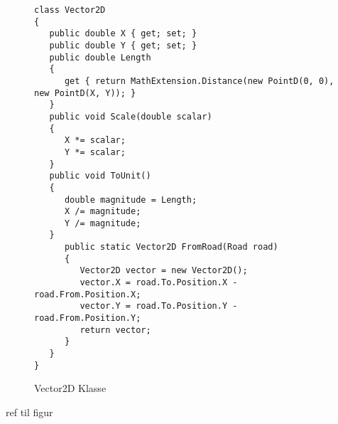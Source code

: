 \begin{figure}[H]
\begin{lstlisting}
class Vector2D
{
   public double X { get; set; }
   public double Y { get; set; }
   public double Length
   {
      get { return MathExtension.Distance(new PointD(0, 0), new PointD(X, Y)); }
   }
   public void Scale(double scalar)
   {
      X *= scalar;
      Y *= scalar;
   }
   public void ToUnit()
   {
      double magnitude = Length;
      X /= magnitude;
      Y /= magnitude;
   }
      public static Vector2D FromRoad(Road road)
      {
         Vector2D vector = new Vector2D();
         vector.X = road.To.Position.X - road.From.Position.X;
         vector.Y = road.To.Position.Y - road.From.Position.Y;
         return vector;
      }
   }
}
\end{lstlisting}
\caption{Vector2D Klasse}\label{MathExtensionClass}
\end{figure}

ref til figur